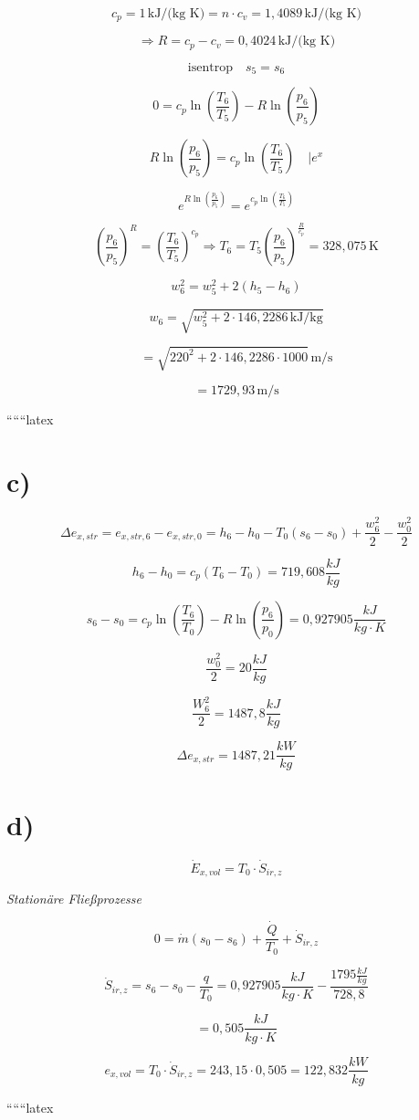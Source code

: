 \[
c_p = 1 \, \text{kJ/(kg K)} = n \cdot c_v = 1,4089 \, \text{kJ/(kg K)}
\]

\[
\Rightarrow R = c_p - c_v = 0,4024 \, \text{kJ/(kg K)}
\]

\[
\text{isentrop} \quad s_5 = s_6
\]

\[
0 = c_p \ln \left( \frac{T_6}{T_5} \right) - R \ln \left( \frac{p_6}{p_5} \right)
\]

\[
R \ln \left( \frac{p_6}{p_5} \right) = c_p \ln \left( \frac{T_6}{T_5} \right) \quad | e^x
\]

\[
e^{R \ln \left( \frac{p_6}{p_5} \right)} = e^{c_p \ln \left( \frac{T_6}{T_5} \right)}
\]

\[
\left( \frac{p_6}{p_5} \right)^R = \left( \frac{T_6}{T_5} \right)^{c_p} \Rightarrow T_6 = T_5 \left( \frac{p_6}{p_5} \right)^{\frac{R}{c_p}} = 328,075 \, \text{K}
\]

\[
w_6^2 = w_5^2 + 2 (h_5 - h_6)
\]

\[
w_6 = \sqrt{w_5^2 + 2 \cdot 146,2286 \, \text{kJ/kg}}
\]

\[
= \sqrt{220^2 + 2 \cdot 146,2286 \cdot 1000} \, \text{m/s}
\]

\[
= 1729,93 \, \text{m/s}
\]

``````latex

\section*{c)}

\[
\Delta e_{x,str} = e_{x,str,6} - e_{x,str,0} = h_6 - h_0 - T_0 (s_6 - s_0) + \frac{w_6^2}{2} - \frac{w_0^2}{2}
\]

\[
h_6 - h_0 = c_p (T_6 - T_0) = 719,608 \frac{kJ}{kg}
\]

\[
s_6 - s_0 = c_p \ln \left( \frac{T_6}{T_0} \right) - R \ln \left( \frac{p_6}{p_0} \right) = 0,927905 \frac{kJ}{kg \cdot K}
\]

\[
\frac{w_0^2}{2} = 20 \frac{kJ}{kg}
\]

\[
\frac{W_6^2}{2} = 1487,8 \frac{kJ}{kg}
\]

\[
\Delta e_{x,str} = 1487,21 \frac{kW}{kg}
\]

\section*{d)}

\[
\dot{E}_{x,vol} = T_0 \cdot \dot{S}_{ir,z}
\]

\textit{Stationäre Fließprozesse}

\[
0 = \dot{m} (s_0 - s_6) + \frac{\dot{Q}}{T_0} + \dot{S}_{ir,z}
\]

\[
\dot{S}_{ir,z} = s_6 - s_0 - \frac{q}{T_0} = 0,927905 \frac{kJ}{kg \cdot K} - \frac{1795 \frac{kJ}{kg}}{728,8}
\]

\[
= 0,505 \frac{kJ}{kg \cdot K}
\]

\[
e_{x,vol} = T_0 \cdot \dot{S}_{ir,z} = 243,15 \cdot 0,505 = 122,832 \frac{kW}{kg}
\]

``````latex


